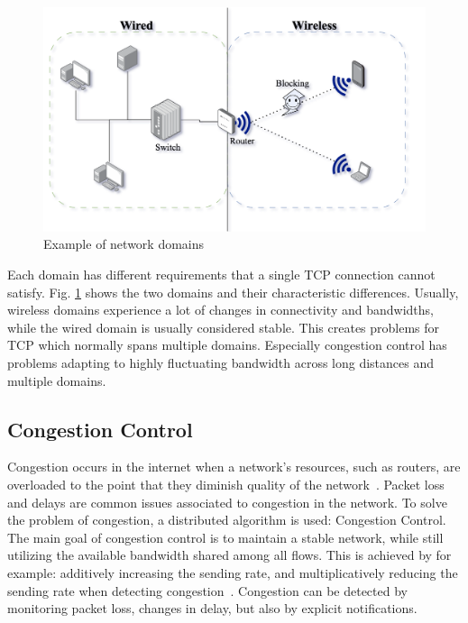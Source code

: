 \documentclass[a4paper,english, 11pt]{report}
\begin{document}
\begin{figure}[h] %
	\centering
	\includegraphics[scale=0.65]{../diagrams/drawio/domains.png}
  	\caption{Example of network domains}
  	\label{fig:domains}
\end{figure}

Each domain has different requirements that a single TCP connection cannot satisfy. Fig. \ref{fig:domains} shows the two domains and their characteristic differences. Usually, wireless domains experience a lot of changes in connectivity and bandwidths, while the wired domain is usually considered stable. This creates problems for TCP which normally spans multiple domains. Especially congestion control has problems adapting to highly fluctuating bandwidth across long distances and multiple domains. 

\subsection{Congestion Control}
Congestion occurs in the internet when a network's resources, such as routers, are overloaded to the point that they diminish quality of the network~\cite{rfc6077}. Packet loss and delays are common issues associated to congestion in the network. To solve the problem of congestion, a distributed algorithm is used: Congestion Control. The main goal of congestion control is to maintain a stable network, while still utilizing the available bandwidth shared among all flows. This is achieved by for example: additively increasing the sending rate, and multiplicatively reducing the sending rate when detecting congestion~\cite{welzl_congestion}. Congestion can be detected by monitoring packet loss, changes in delay, but also by explicit notifications.\\
\end{document}
